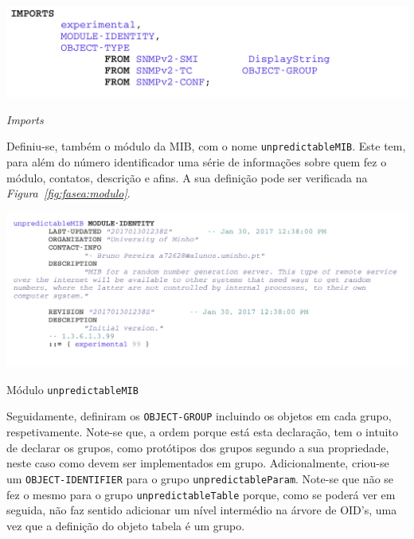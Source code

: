 \begin{center}
 	
 	\includegraphics[width=\textwidth,height=\textheight,keepaspectratio]{resources/images/faseA/mib/imports.png}
 	\captionsetup{type=figure, width=0.8\linewidth}
	\caption{\emph{Imports} }
\label{fig:fasea:imports} 
\end{center}

\newpage

Definiu-se, também o módulo da MIB, com o nome
\texttt{unpredictableMIB}. Este tem, para além do número identificador uma série
de informações sobre quem fez o módulo, contatos, descrição e afins. A sua
definição pode ser verificada na \emph{Figura~\ref{fig:fasea:modulo}}. 

\begin{center}
 	
 	\includegraphics[width=\textwidth,height=\textheight,keepaspectratio]{resources/images/faseA/mib/modulo.png}
 	\captionsetup{type=figure, width=0.8\linewidth}
	\caption{Módulo \texttt{unpredictableMIB} }
\label{fig:fasea:modulo} 
\end{center}



Seguidamente, definiram os \texttt{OBJECT-GROUP} incluindo os objetos em cada
grupo, respetivamente. Note-se que, a ordem porque está esta declaração, tem
o intuito de declarar os grupos, como protótipos dos grupos segundo a sua
propriedade, neste caso como devem ser implementados em grupo. Adicionalmente,
criou-se um \texttt{OBJECT-IDENTIFIER} para o grupo \texttt{unpredictableParam}.
Note-se que não se fez o mesmo para o grupo \texttt{unpredictableTable} porque,
como se poderá ver em seguida, não faz sentido adicionar um nível intermédio na
árvore de OID's, uma vez que a definição do objeto tabela é um grupo.

